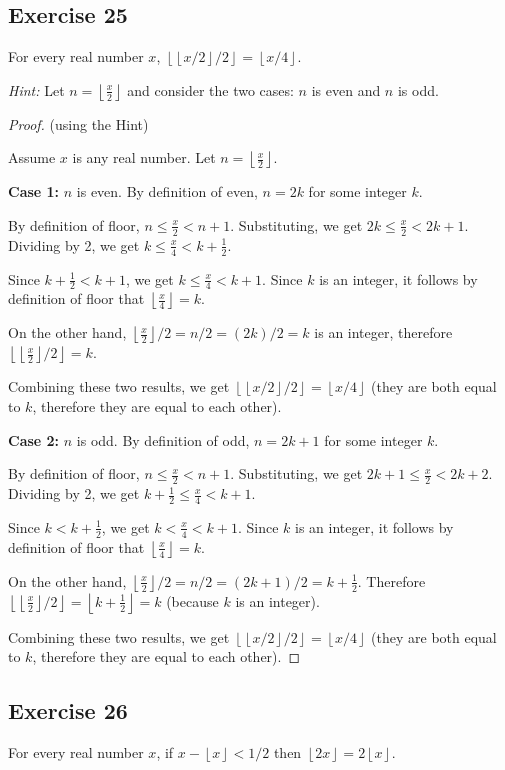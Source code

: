 \documentclass[14pt]{extarticle}
\newcommand{\floor}[1]{{\left\lfloor#1\right\rfloor}}
\begin{document}
\subsection{Exercise 25}
For every real number $x$, $\floor{\floor{x/2}/2} = \floor{x/4}$.

{\it Hint:} Let $n = \floor{\frac{x}{2}}$ and consider the two cases: $n$ is even and $n$ is odd.

\begin{proof}
(using the Hint)

Assume $x$ is any real number. Let $n = \floor{\frac{x}{2}}$.

{\bf Case 1:} $n$ is even. By definition of even, $n = 2k$ for some integer $k$.

By definition of floor, $n \leq \frac{x}{2} < n+1$. Substituting, we get $2k \leq \frac{x}{2} < 2k+1$. 
Dividing by 2, we get $k \leq \frac{x}{4} < k+\frac{1}{2}$. 

Since $k + \frac{1}{2} < k + 1$, we get $k \leq \frac{x}{4} < k+1$. Since $k$ is an integer, it follows by definition of floor that $\floor{\frac{x}{4}} = k$.

On the other hand, $\floor{\frac{x}{2}}/2 = n/2 = (2k)/2 = k$ is an integer, therefore $\floor{\floor{\frac{x}{2}}/2} = k$.

Combining these two results, we get $\floor{\floor{x/2}/2} = \floor{x/4}$ (they are both equal to $k$, therefore they are equal to each other).

{\bf Case 2:} $n$ is odd. By definition of odd, $n = 2k+1$ for some integer $k$.

By definition of floor, $n \leq \frac{x}{2} < n+1$. Substituting, we get $2k+1 \leq \frac{x}{2} < 2k+2$. 
Dividing by 2, we get $k+\frac{1}{2} \leq \frac{x}{4} < k + 1$. 

Since $k < k + \frac{1}{2}$, we get $k < \frac{x}{4} < k+1$. Since $k$ is an integer, it follows by definition of floor that $\floor{\frac{x}{4}} = k$.

On the other hand, $\floor{\frac{x}{2}}/2 = n/2 = (2k+1)/2 = k + \frac{1}{2}$. Therefore $\floor{\floor{\frac{x}{2}}/2} = \floor{k + \frac{1}{2}} = k$ (because $k$ is an integer).

Combining these two results, we get $\floor{\floor{x/2}/2} = \floor{x/4}$ (they are both equal to $k$, therefore they are equal to each other).
\end{proof}

\subsection{Exercise 26}
For every real number $x$, if $x - \floor{x} < 1/2$ then $\floor{2x} = 2\floor{x}$.
\end{document}
